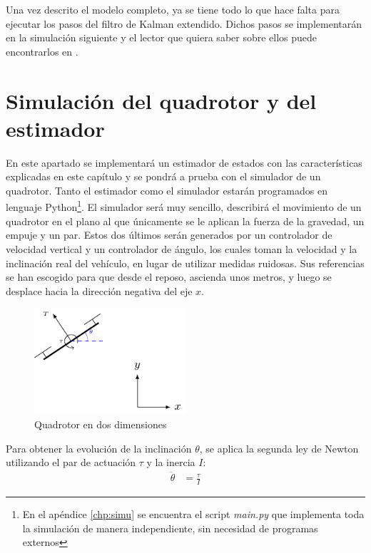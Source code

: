 Una vez descrito el modelo completo, ya se tiene todo lo que hace falta para ejecutar los pasos del filtro de Kalman extendido. Dichos pasos se implementarán en la simulación siguiente y el lector que quiera saber sobre ellos puede encontrarlos en \cite{arias2019control}.


\section{Simulación del quadrotor y del estimador}
En este apartado se implementará un estimador de estados con las características explicadas en este capítulo y se pondrá a prueba con el simulador de un quadrotor. Tanto el estimador como el simulador estarán programados en lenguaje Python\footnote{En el apéndice \ref{chp:simu} se encuentra el script \textit{main.py} que implementa toda la simulación de manera independiente, sin necesidad de programas externos}. El simulador será muy sencillo, describirá el movimiento de un quadrotor en el plano al que únicamente se le aplican la fuerza de la gravedad, un empuje y un par. Estos dos últimos serán generados por un controlador de velocidad vertical y un controlador de ángulo, los cuales toman la velocidad y la inclinación real del vehículo, en lugar de utilizar medidas ruidosas. Sus referencias se han escogido para que desde el reposo, ascienda unos metros, y luego se desplace hacia la dirección negativa del eje $x$. 


\begin{figure}
\includegraphics[width=0.5\textwidth]{estimador_px4/tikz/quadrotor_2d}
\caption{Quadrotor en dos dimensiones}
\label{fig:model}
\end{figure}

Para obtener la evolución de la inclinación $\theta$, se aplica la segunda ley de Newton utilizando el par de actuación $\tau$ y la inercia $I$:
\begin{align}
        \ddot{\theta} &= \frac{\tau}{I} 
\end{align}

